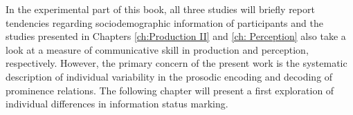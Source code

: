 In the experimental part of this book, all three studies will briefly report tendencies regarding sociodemographic information of participants and the studies presented in Chapters \ref{ch:Production II} and \ref{ch: Perception} also take a look at a measure of communicative skill in production and perception, respectively. However, the primary concern of the present work is the systematic description of individual variability in the prosodic encoding and decoding of prominence relations. The following chapter will present a first exploration of individual differences in information status marking.
